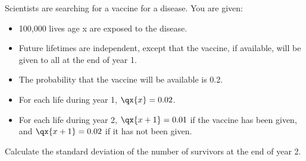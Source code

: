 Scientists are searching for a vaccine for a disease. You are given:
\begin{itemize}
  \item 100,000 lives age x are exposed to the disease.
  \item Future lifetimes are independent, except that the vaccine, if available, will be given to all at the end of year 1.
  \item The probability that the vaccine will be available is 0.2.
  \item For each life during year 1, $\qx{x}=0.02$.
  \item For each life during year 2, $\qx{x+1}=0.01$ if the vaccine has been given, and $\qx{x+1}=0.02$ if it has not been given.
\end{itemize}
Calculate the standard deviation of the number of survivors at the end of year 2.

